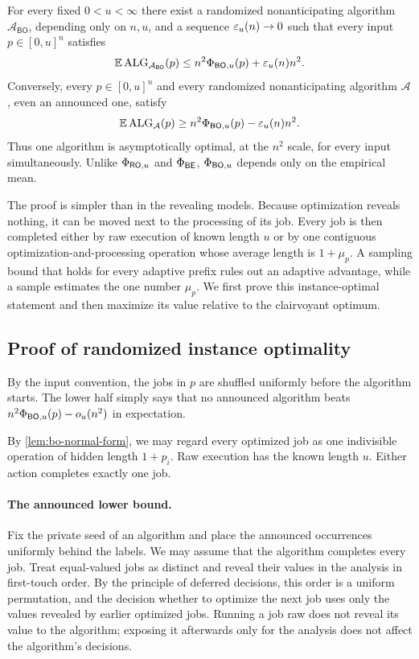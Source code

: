 \begin{theorem}
\label{thm:bo-instance}
For every fixed $0<u<\infty$ there exist a randomized nonanticipating algorithm
$\mathcal A_{\mathsf{BO}}$, depending only on $n,u$, and a sequence
$\varepsilon_u(n)\to0$ such that every input $p\in[0,u]^n$ satisfies
\begin{equation}
 \mathbb{E}\operatorname{ALG}_{\mathcal A_{\mathsf{BO}}}(p)
 \le n^2\Phi_{\mathsf{BO},u}(p)+\varepsilon_u(n)n^2.
 \label{eq:bo-instance-upper}
\end{equation}
Conversely, every $p\in[0,u]^n$ and every randomized nonanticipating algorithm
$\mathcal A$, even an announced one, satisfy
\begin{equation}
 \mathbb{E}\operatorname{ALG}_{\mathcal A}(p)
 \ge n^2\Phi_{\mathsf{BO},u}(p)-\varepsilon_u(n)n^2.
 \label{eq:bo-instance-lower}
\end{equation}
Thus one algorithm is asymptotically optimal, at the $n^2$ scale, for every
input simultaneously.  Unlike $\Phi_{\mathsf{RO},u}$ and $\Phi_{\mathsf{BE}}$, $\Phi_{\mathsf{BO},u}$
depends only on the empirical mean.
\end{theorem}

The proof is simpler than in the revealing models.  Because optimization
reveals nothing, it can be moved next to the processing of its job.  Every
job is then completed either by raw execution of known length $u$ or by one
contiguous optimization-and-processing operation whose average length is
$1+\mu_p$.  A sampling bound that holds for every adaptive prefix rules out
an adaptive advantage, while a sample estimates the one number $\mu_p$.
We first prove this instance-optimal statement and then maximize its value
relative to the clairvoyant optimum.

\subsection{Proof of randomized instance optimality}

By the input convention, the jobs in $p$ are shuffled uniformly
before the algorithm starts.  The lower half simply says that no announced
algorithm beats $n^2\Phi_{\mathsf{BO},u}(p)-o_u(n^2)$ in expectation.

By \cref{lem:bo-normal-form}, we may regard every optimized job as one
indivisible operation of hidden length $1+p_i$.  Raw execution has the known
length $u$.  Either action completes exactly one job.

\paragraph{The announced lower bound.}
Fix the private seed of an algorithm and place the announced occurrences
uniformly behind the labels.  We may assume that the algorithm completes every
job.  Treat equal-valued jobs as distinct and reveal their values in the
analysis in first-touch order.  By the principle of deferred decisions, this order is a
uniform permutation, and the decision whether to optimize the next job uses
only the values revealed by earlier optimized jobs.  Running a job raw does
not reveal its value to the algorithm; exposing it
afterwards only for the analysis does not affect the algorithm's decisions.

